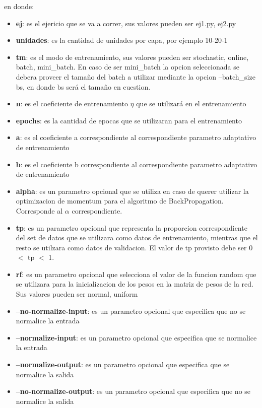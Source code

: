 en donde:
\begin{itemize}
  \item \textbf{ej}: es el ejericio que se va a correr, sus valores pueden ser {ej1.py, ej2.py}
  \item \textbf{unidades}: es la cantidad de unidades por capa, por ejemplo 10-20-1
  \item \textbf{tm}: es el modo de entrenamiento, sus valores pueden ser {stochastic, online, batch, mini\_batch}. En caso de ser mini\_batch la opcion seleccionada se debera
            proveer el tamaño del batch a utilizar mediante la opcion --batch\_size bs, en donde bs será el tamaño en cuestion.
  \item \textbf{n}: es el coeficiente de entrenamiento $\eta$ que se utilizará en el entrenamiento
  \item \textbf{epochs}: es la cantidad de epocas que se utilizaran para el entrenamiento
  \item \textbf{a}: es el coeficiente a correspondiente al correspondiente parametro adaptativo de entrenamiento
  \item \textbf{b}: es el coeficiente b correspondiente al correspondiente parametro adaptativo de entrenamiento
  \item \textbf{alpha}: es un parametro opcional que se utiliza en caso de querer utilizar la optimizacion de momentum para el algoritmo de BackPropagation. Corresponde al $\alpha$
                correspondiente.
  \item \textbf{tp}: es un parametro opcional que representa la proporcion correspondiente del set de datos que se utilizara como datos de entrenamiento,
            mientras que el resto se utilzara como datos de validacion. El valor de tp provisto debe ser 0 $<$ tp $<$ 1.
  \item \textbf{rf}: es un parametro opcional que selecciona el valor de la funcion random que se utilizara para la inicializacion de los pesos en la matriz de pesos de la red.
            Sus valores pueden ser {normal, uniform}
  \item \textbf{--no-normalize-input}: es un parametro opcional que especifica que no se normalice la entrada
  \item \textbf{--normalize-input}: es un parametro opcional que especifica que se normalice la entrada
  \item \textbf{--normalize-output}: es un parametro opcional que especifica que se normalice la salida
  \item \textbf{--no-normalize-output}: es un parametro opcional que especifica que no se normalice la salida
\end{itemize}

